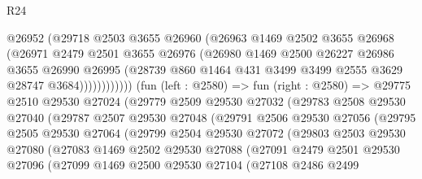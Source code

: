 \begin{lexlean}{R24}
\begin{coremodule}
                      @26952
                      (@29718
                        @2503
                        @3655
                        @26960
                        (@26963
                          @1469
                          @2502
                          @3655
                          @26968
                          (@26971
                            @2479
                            @2501
                            @3655
                            @26976
                            (@26980
                              @1469
                              @2500
                              @26227
                              @26986
                              @3655
                              @26990
                              @26995
                              (@28739
                                @860
                                @1464
                                @431
                                @3499
                                @3499
                                @2555
                                @3629
                                @28747
                                @3684))))))))))))
        (fun (left : @2580) =>
        fun (right : @2580) =>
        @29775
          @2510
          @29530
          @27024
          (@29779
            @2509
            @29530
            @27032
            (@29783
              @2508
              @29530
              @27040
              (@29787
                @2507
                @29530
                @27048
                (@29791
                  @2506
                  @29530
                  @27056
                  (@29795
                    @2505
                    @29530
                    @27064
                    (@29799
                      @2504
                      @29530
                      @27072
                      (@29803
                        @2503
                        @29530
                        @27080
                        (@27083
                          @1469
                          @2502
                          @29530
                          @27088
                          (@27091
                            @2479
                            @2501
                            @29530
                            @27096
                            (@27099
                              @1469
                              @2500
                              @29530
                              @27104
                              (@27108
                                @2486
                                @2499

\end{coremodule}
\end{lexlean}

